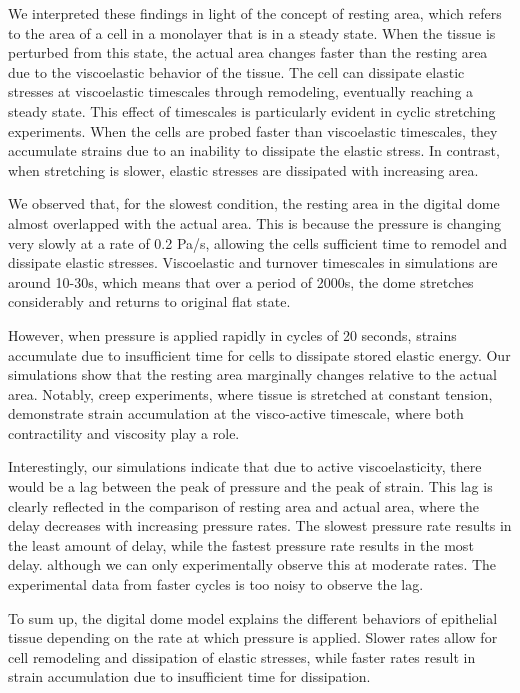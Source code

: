 We interpreted these findings in light of the concept of resting area, which refers to the area of a cell in a monolayer that is in a steady state. When the tissue is perturbed from this state, the actual area changes faster than the resting area due to the viscoelastic behavior of the tissue. The cell can dissipate elastic stresses at viscoelastic timescales through remodeling, eventually reaching a steady state. This effect of timescales is particularly evident in cyclic stretching experiments. When the cells are probed faster than viscoelastic timescales, they accumulate strains due to an inability to dissipate the elastic stress. In contrast, when stretching is slower, elastic stresses are dissipated with increasing area.

We observed that, for the slowest condition, the resting area in the digital dome almost overlapped with the actual area. This is because the pressure is changing very slowly at a rate of 0.2 Pa/s, allowing the cells sufficient time to remodel and dissipate elastic stresses. Viscoelastic and turnover timescales in simulations are around 10-30s, which means that over a period of 2000s, the dome stretches considerably and returns to original flat state.

However, when pressure is applied rapidly in cycles of 20 seconds, strains accumulate due to insufficient time for cells to dissipate stored elastic energy. Our simulations show that the resting area marginally changes relative to the actual area. Notably, creep experiments, where tissue is stretched at constant tension, demonstrate strain accumulation at the visco-active timescale, where both contractility and viscosity play a role. 

Interestingly, our simulations indicate that due to active viscoelasticity, there would be a lag between the peak of pressure and the peak of strain. This lag is clearly reflected in the comparison of resting area and actual area, where the delay decreases with increasing pressure rates. The slowest pressure rate results in the least amount of delay, while the fastest pressure rate results in the most delay. although we can only experimentally observe this at moderate rates. The experimental data from faster cycles is too noisy to observe the lag.

To sum up, the digital dome model explains the different behaviors of epithelial tissue depending on the rate at which pressure is applied. Slower rates allow for cell remodeling and dissipation of elastic stresses, while faster rates result in strain accumulation due to insufficient time for dissipation.


